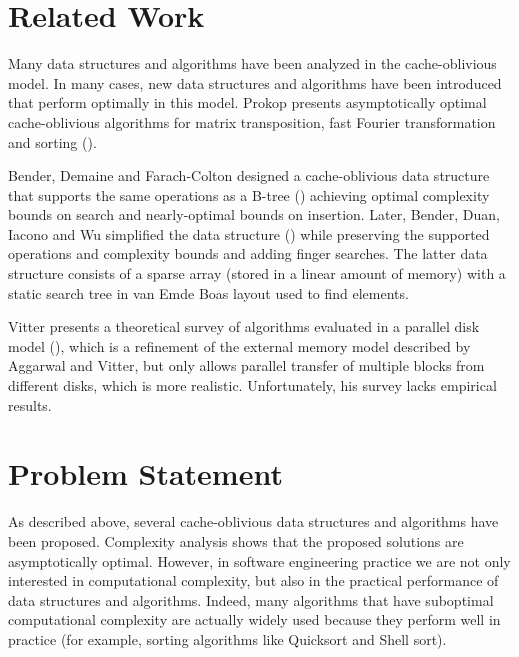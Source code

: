 \documentclass{acm_proc_article-sp}
\begin{document}
\section{Related Work}
Many data structures and algorithms have been analyzed in the cache-oblivious model. In many cases, new data structures and algorithms have been introduced that perform optimally in this model. Prokop presents asymptotically optimal cache-oblivious algorithms for matrix transposition, fast Fourier transformation and sorting (\cite{prokop1999coa}).

Bender, Demaine and Farach-Colton designed a cache-oblivious data structure that supports the same operations as a B-tree (\cite{bender2005cob}) achieving optimal complexity bounds on search and nearly-optimal bounds on insertion. Later, Bender, Duan, Iacono and Wu simplified the data structure (\cite{bender2004lpc}) while preserving the supported operations and complexity bounds and adding finger searches. The latter data structure consists of a sparse array (stored in a linear amount of memory) with a static search tree in van Emde Boas layout used to find elements.

Vitter presents a theoretical survey of algorithms evaluated in a parallel disk model (\cite{vitter2001ema}), which is a refinement of the external memory model described by Aggarwal and Vitter, but only allows parallel transfer of multiple blocks from different disks, which is more realistic. Unfortunately, his survey lacks empirical results.



\section{Problem Statement}
As described above, several cache-oblivious data structures and algorithms have been proposed. Complexity analysis shows that the proposed solutions are asymptotically optimal. However, in software engineering practice we are not only interested in computational complexity, but also in the practical performance of data structures and algorithms. Indeed, many algorithms that have suboptimal computational complexity are actually widely used because they perform well in practice (for example, sorting algorithms like Quicksort and Shell sort).
\end{document}
